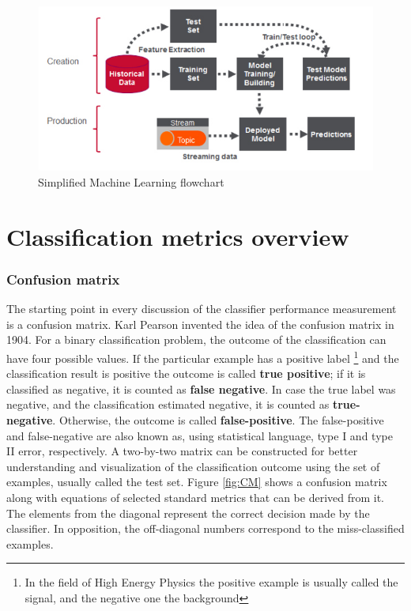 \begin{figure}
\centering
\includegraphics{figures/MLflowchart.jpg}
\caption{Simplified Machine Learning flowchart
\label{fig:ML_flow}}
\end{figure}


\section{Classification metrics overview}
\subsubsection{Confusion matrix}
The starting point in every discussion of the classifier performance measurement is a confusion matrix. Karl Pearson invented the idea of the confusion matrix in 1904. For a binary classification problem, the outcome of the classification can have four possible values. If the particular example has a positive label \footnote{In the field of High Energy Physics the positive example is usually called the signal, and the negative one the background} and the classification result is positive the outcome is called \textbf{true positive}; if it is classified as negative, it is counted as \textbf{false negative}. In case the true label was negative, and the classification estimated negative, it is counted as \textbf{true-negative}. Otherwise, the outcome is called \textbf{false-positive}. The false-positive and false-negative are also known as, using statistical language, type I and type II error, respectively. 
A two-by-two matrix can be constructed for better understanding and visualization of the classification outcome using the set of examples, usually called the test set. Figure \ref{fig:CM} shows a confusion matrix along with equations of selected standard metrics that can be derived from it. The elements from the diagonal represent the correct decision made by the classifier. In opposition, the off-diagonal numbers correspond to the miss-classified examples. 

